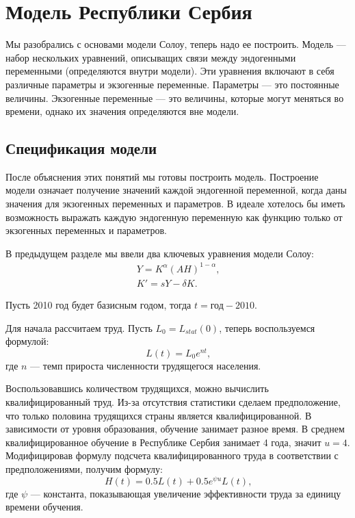 \chapter{Модель Республики Сербия}

Мы разобрались с основами модели Солоу, теперь надо ее построить.
Модель --- набор нескольких уравнений, описыващих связи между эндогенными переменными (определяются внутри модели).
Эти уравнения включают в себя различные параметры и экзогенные переменные.
Параметры --- это постоянные величины.
Экзогенные переменные --- это величины, которые могут меняться во времени, однако их значения определяются вне модели.

\section{Спецификация модели}

После объяснения этих понятий мы готовы построить модель.
Построение модели означает получение значений каждой эндогенной переменной, когда даны значения для экзогенных переменных и параметров.
В идеале хотелось бы иметь возможность выражать каждую эндогенную переменную как функцию только от экзогенных переменных и параметров.

В предыдущем разделе мы ввели два ключевых уравнения модели Солоу:
\begin{align*}
	Y=K^{\alpha}(AH)^{1-\alpha}\text{,}\\
	K'=sY - \delta K \text{.}
\end{align*}

Пусть 2010 год будет базисным годом, тогда $t = \text{год} - 2010$.

Для начала рассчитаем труд.
Пусть $L_0 = L_{stat}(0)$, теперь воспользуемся формулой:
\begin{equation*}
	L(t) = L_0 e^{nt}\text{,}
\end{equation*}
где $n$ --- темп прироста численности трудящегося населения.

Воспользовавшись количеством трудящихся, можно вычислить квалифицированный труд.
Из-за отсутствия статистики сделаем предположение, что только половина трудящихся страны является квалифицированной.
В зависимости от уровня образования, обучение занимает разное время.
В среднем квалифицированное обучение в Республике Сербия занимает 4 года, значит $u = 4$.
Модифицировав формулу подсчета квалифицированного труда в соответствии с предположениями, получим формулу:
\begin{equation*}
H(t) = 0.5L(t) + 0.5 e^{\psi u}L(t)\text{,}
\end{equation*}
где $\psi$ --- константа, показывающая увеличение эффективности труда за единицу времени обучения.

